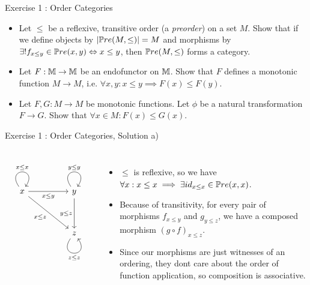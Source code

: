 \begin{frame}{Exercise 1 : Order Categories}
\begin{itemize}
	\item[a)] Let $\leq$ be a reflexive, transitive order (a \textit{preorder}) on a set $M$. Show that if we define objects by $|\mathbb{P}re(M, \leq)| = M$ and morphisms by $\exists! f_{x \leq y} \in \mathbb{P}re(x,y) \Leftrightarrow x \leq y$, then $\mathbb{P}re(M, \leq)$ forms a category.
	\item[b)] Let $F : \mathbb{M} \to \mathbb{M}$ be an endofunctor on $\mathbb{M}$. Show that $F$ defines a monotonic function $M \to M$, i.e. $\forall x,y : x \leq y \implies F(x) \leq F(y)$.
	\item[c)] Let $F,G : M \to M$ be monotonic functions. Let $\phi$ be a natural transformation $F \to G$. Show that $\forall x \in M: F(x) \leq G(x)$.
\end{itemize}
\end{frame}
\begin{frame}[fragile]{Exercise 1 : Order Categories, Solution a)}
	\begin{columns}
		\[\begin{tikzcd}
			x && y \\
			\\
			&& z
			\arrow["{x \leq x}", from=1-1, to=1-1, loop, in=55, out=125, distance=10mm]
			\arrow["{{x \leq y}}"', from=1-1, to=1-3]
			\arrow["{{x \leq z}}"', from=1-1, to=3-3]
			\arrow["{y \leq y}", from=1-3, to=1-3, loop, in=55, out=125, distance=10mm]
			\arrow["{{y \leq z}}"', from=1-3, to=3-3]
			\arrow["{z \leq z}"', from=3-3, to=3-3, loop, in=305, out=235, distance=10mm]
		\end{tikzcd}\]
		\begin{itemize}
			\item $\leq$ is reflexive, so we have $\forall x : x \leq x \implies \exists id_{x \leq x} \in \mathbb{P}re(x,x)$.
			\item Because of transitivity, for every pair of morphisms $f_{x \leq y}$ and $g_{y \leq z}$, we have a composed morphism $(g \circ f)_{x \leq z}$.
			\item Since our morphisms are just witnesses of an ordering, they dont care about the order of function application, so composition is associative.
		\end{itemize} 
	\end{columns} 
\end{frame}
